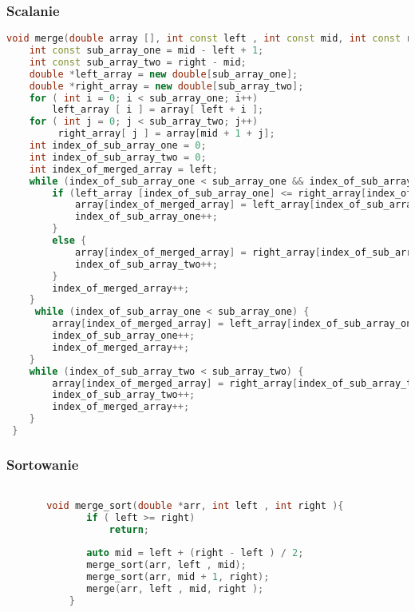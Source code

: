 \documentclass[12pt]{article}
\begin{document}
\subsubsection{Scalanie}
{\small
\begin{lstlisting}[language=C++]
void merge(double array [], int const left , int const mid, int const right ){
    int const sub_array_one = mid - left + 1;
    int const sub_array_two = right - mid;
    double *left_array = new double[sub_array_one];
    double *right_array = new double[sub_array_two];
    for ( int i = 0; i < sub_array_one; i++)
        left_array [ i ] = array[ left + i ];
    for ( int j = 0; j < sub_array_two; j++)
         right_array[ j ] = array[mid + 1 + j];
    int index_of_sub_array_one = 0;
    int index_of_sub_array_two = 0;
    int index_of_merged_array = left;
    while (index_of_sub_array_one < sub_array_one && index_of_sub_array_two < sub_array_two) {
        if (left_array [index_of_sub_array_one] <= right_array[index_of_sub_array_two]) {
            array[index_of_merged_array] = left_array[index_of_sub_array_one];
            index_of_sub_array_one++;
        }
        else {
            array[index_of_merged_array] = right_array[index_of_sub_array_two];
            index_of_sub_array_two++;
        }
        index_of_merged_array++;
    }
     while (index_of_sub_array_one < sub_array_one) {
        array[index_of_merged_array] = left_array[index_of_sub_array_one];
        index_of_sub_array_one++;
        index_of_merged_array++;
    }
    while (index_of_sub_array_two < sub_array_two) {
        array[index_of_merged_array] = right_array[index_of_sub_array_two];
        index_of_sub_array_two++;
        index_of_merged_array++;
    }
 }
       \end{lstlisting}

}

\subsubsection{Sortowanie}

{\small
\begin{lstlisting}[language=C++]

       void merge_sort(double *arr, int left , int right ){
              if ( left >= right)
                  return;
          
              auto mid = left + (right - left ) / 2;
              merge_sort(arr, left , mid);
              merge_sort(arr, mid + 1, right);
              merge(arr, left , mid, right );
           }
       \end{lstlisting}

}
\end{document}

